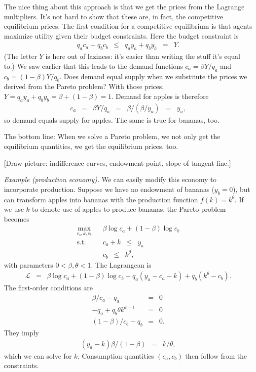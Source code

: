 \documentclass[11pt]{article}
\begin{document}
The nice thing about this approach is that
we get the prices from the Lagrange multipliers.
It's not hard to show that these are, in fact,
the competitive equilibrium prices.
The first condition for a competitive equilibrium is that agents maximize
utility given their budget constraints.
Here the budget constraint is
\begin{eqnarray*}
    q_a c_a + q_b c_b &\leq& q_a y_a + q_b y_b \;\;=\;\; Y.
\end{eqnarray*}
(The letter $Y$ is here out of laziness:  it's easier than writing 
the stuff it's equal to.)
We saw earlier that this leads to the demand functions
$ c_a = \beta Y/q_a$ and $c_b = (1-\beta) Y/q_b$.
Does demand equal supply when we substitute the prices we derived
from the Pareto problem?
With those prices,
$ Y = q_a y_a + q_b y_b = \beta + (1-\beta) = 1$.
Demand for apples is therefore
\begin{eqnarray*}
    c_a &=& \beta Y / q_a \;\;=\;\; \beta / (\beta/y_a) \;\;=\;\; y_ a,
\end{eqnarray*}
so demand equals supply for apples.
The same is true for bananas, too.

The bottom line:  When we solve a Pareto problem,
we not only get the equilibrium quantities,
we get the equilibrium prices, too.


[Draw picture:  indifference curves, endowment point,
slope of tangent line.]

{\it Example (production economy).\/}
We can easily modify this economy to incorporate production.
Suppose we have no endowment of bananas ($y_b=0$),
but can transform apples into bananas with the
production function $f(k) = k^\theta$.
If we use $k$ to denote use of apples to produce bananas,
the Pareto problem becomes
\begin{eqnarray*}
    \max_{c_a,k,c_b} &&  \beta \log c_a + (1-\beta) \log c_b \\
    \mbox{s.t.}   &&  c_a + k \;\;\leq\;\; y_a \\
                  &&  c_b \;\;\leq\;\; k^\theta ,
\end{eqnarray*}
with parameters $ 0 < \beta,\theta < 1$.
The Lagrangean is
\begin{eqnarray*}
    \mathcal{L} &=&  \beta \log c_a + (1-\beta) \log c_b
                + q_a (y_a - c_a - k) + q_b (k^\theta - c_b ) .
\end{eqnarray*}
The first-order conditions are
\begin{eqnarray*}
    \beta/c_a - q_a &=& 0 \\
    - q_a + q_b \theta k^{\theta-1} &=& 0 \\
   (1-\beta)/c_b - q_b &=& 0 .
\end{eqnarray*}
They imply
\begin{eqnarray*}
    (y_a - k) \beta /(1-\beta) &=& k / \theta ,
\end{eqnarray*}
which we can solve for $k$.
Consumption quantities $(c_a,c_b)$ then follow from the
constraints.
\end{document}

